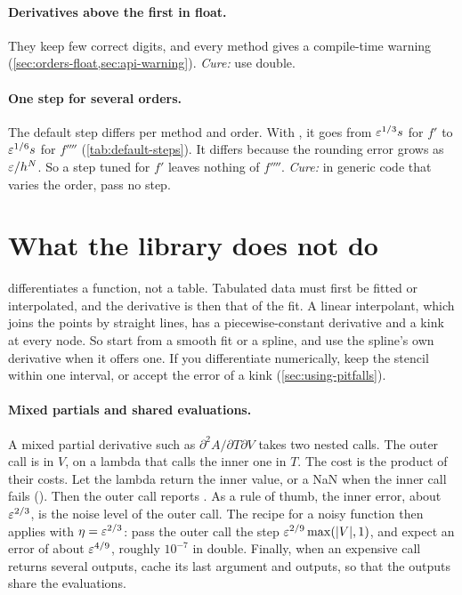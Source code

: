 \paragraph{Derivatives above the first in float.} They keep few correct digits, and every method gives a
compile-time warning (\cref{sec:orders-float,sec:api-warning}).
\emph{Cure:} use double.


\paragraph{One step for several orders.} The default step differs per method and order. With , it
goes from $\varepsilon^{1/3} s$ for $f'$ to $\varepsilon^{1/6} s$ for $f''''$ (\cref{tab:default-steps}). It differs
because the rounding error grows as $\varepsilon / h^N$. So a step tuned for $f'$ leaves nothing of $f''''$.
\emph{Cure:} in generic code that varies the order, pass no step.

\section{What the library does not do}\label{sec:using-not}

 differentiates a function, not a table. Tabulated data must first be fitted or interpolated, and
the derivative is then that of the fit. A linear interpolant, which joins the points by straight lines, has a
piecewise-constant derivative and a kink at every node. So start from a smooth fit or a spline, and use the spline's own derivative when it
offers one. If you differentiate numerically, keep the stencil within one interval, or accept the error of a kink
(\cref{sec:using-pitfalls}).

\paragraph{Mixed partials and shared evaluations.} A mixed partial derivative such as
$\partial^2 A / \partial T \partial V$ takes two nested calls. The outer call is in $V$, on a lambda that calls the
inner one in $T$. The cost is the product of their costs. Let the lambda return the inner value, or a NaN when the
inner call fails (). Then the outer call reports
. As a rule of thumb, the inner error, about $\varepsilon^{2/3}$, is the noise level of the outer call.
The recipe for a noisy function then applies with $\eta = \varepsilon^{2/3}$: pass the outer call the step
$\varepsilon^{2/9} \max(\lvert V \rvert, 1)$, and expect an error of about $\varepsilon^{4/9}$, roughly $10^{-7}$ in double.
Finally, when an expensive call returns several outputs, cache its last argument and outputs, so that the outputs
share the evaluations.


